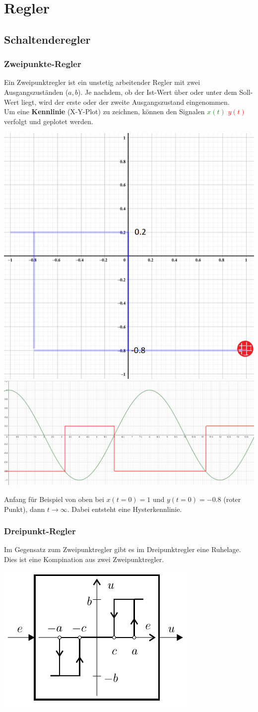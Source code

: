 \section{Regler}
\subsection{Schaltenderegler}
\subsubsection{Zweipunkte-Regler}
Ein Zweipunktregler ist ein unstetig arbeitender Regler mit zwei Ausgangszuständen ($a,b$). Je nachdem,
ob der Ist-Wert über oder unter dem Soll-Wert liegt, wird der erste oder der zweite Ausgangszustand
eingenommen.~\\

\noindent Um eine \textbf{Kennlinie} (X-Y-Plot) zu zeichnen, können den Signalen \textcolor{green}{$x(t)$}  \textcolor{red}{$y(t)$} verfolgt und geplotet werden.
\begin{center}
	\includegraphics[width=0.3\columnwidth]{Images/kennlinie}
	\includegraphics[width=0.6\columnwidth]{Images/zweipunkte-regler}
\end{center}

\noindent Anfang für Beispiel von oben bei $x(t = 0) = 1$ und $y(t = 0) = -0.8$ (roter Punkt), dann $t\rightarrow\infty$. Dabei entsteht eine Hysterkennlinie.

\subsubsection{Dreipunkt-Regler}
Im Gegensatz zum Zweipunktregler gibt es im Dreipunktregler eine Ruhelage. Dies ist eine Kompination aus zwei Zweipunktregler.\\
\begin{center}
	\includegraphics[width=0.3\columnwidth]{Images/dreipunktregler}
\end{center}


